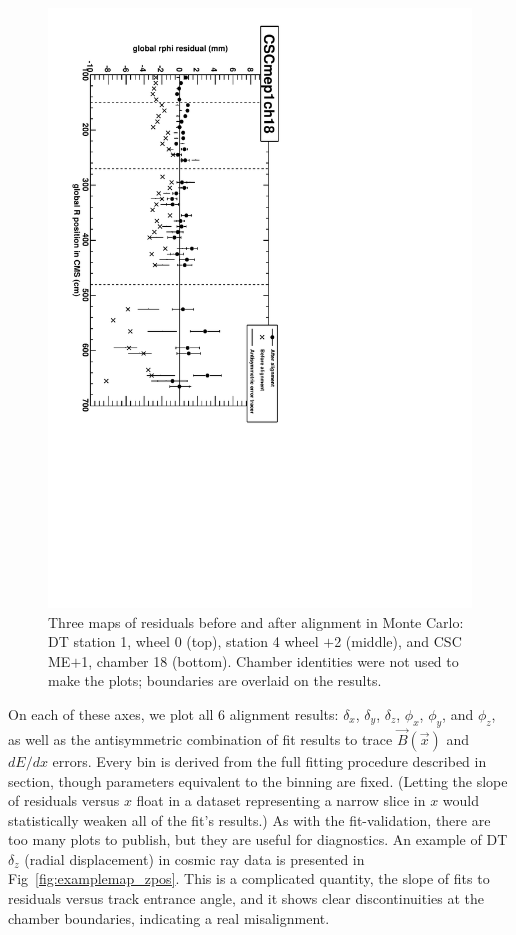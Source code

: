 \documentclass[12pt]{article}
\begin{document}
\begin{figure}
\hspace{0.5 cm} \includegraphics[height=0.8\linewidth, angle=90]{examplemap_CSCrphi1.pdf}

\caption{Three maps of residuals before and after alignment in Monte Carlo: DT station 1, wheel 0 (top), station 4 wheel $+$2 (middle), and CSC ME$+$1, chamber 18 (bottom).  Chamber identities were not used to make the plots; boundaries are overlaid on the results. \label{fig:examplemap_rphi}}
\end{figure}

On each of these axes, we plot all 6 alignment results: $\delta_x$,
$\delta_y$, $\delta_z$, $\phi_x$, $\phi_y$, and $\phi_z$, as well as
the antisymmetric combination of fit results to trace
$\vec{B}(\vec{x})$ and $dE/dx$ errors.  Every bin is derived from the
full fitting procedure described in
section, though parameters equivalent to  %
the binning are fixed.  (Letting the slope of residuals versus $x$
float in a dataset representing a narrow slice in $x$ would
statistically weaken all of the fit's results.)  As with the
fit-validation, there are too many plots to publish, but they are
useful for diagnostics.  An example of DT $\delta_z$ (radial
displacement) in cosmic ray data is presented in
Fig~\ref{fig:examplemap_zpos}.  This is a complicated quantity, the
slope of fits to residuals versus track entrance angle, and it shows
clear discontinuities at the chamber boundaries, indicating a real
misalignment.
\end{document}

